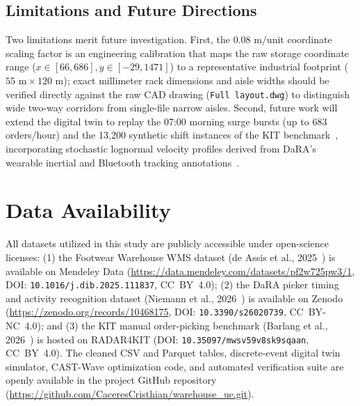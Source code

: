 \documentclass[conference]{IEEEtran}
\begin{document}
\subsection{Limitations and Future Directions}
\label{sec:limitations}
Two limitations merit future investigation. First, the $0.08\text{ m/unit}$ coordinate scaling factor is an engineering calibration that maps the raw storage coordinate range ($x \in [66, 686], y \in [-29, 1471]$) to a representative industrial footprint ($55\text{ m} \times 120\text{ m}$); exact millimeter rack dimensions and aisle widths should be verified directly against the raw CAD drawing (\texttt{Full layout.dwg}) to distinguish wide two-way corridors from single-file narrow aisles. Second, future work will extend the digital twin to replay the 07:00 morning surge bursts (up to 683 orders/hour) and the 13,200 synthetic shift instances of the KIT benchmark~\cite{barlang2026kit}, incorporating stochastic lognormal velocity profiles derived from DaRA's wearable inertial and Bluetooth tracking annotations~\cite{niemann2026dara}.

\section{Data Availability}
\label{sec:data_availability}
All datasets utilized in this study are publicly accessible under open-science licenses: (1) the Footwear Warehouse WMS dataset (de Assis et al., 2025~\cite{assis2025order}) is available on Mendeley Data (\url{https://data.mendeley.com/datasets/pf2w725pw3/1}, DOI: \texttt{10.1016/j.dib.2025.111837}, CC~BY~4.0); (2) the DaRA picker timing and activity recognition dataset (Niemann et al., 2026~\cite{niemann2026dara}) is available on Zenodo (\url{https://zenodo.org/records/10468175}, DOI: \texttt{10.3390/s26020739}, CC~BY-NC~4.0); and (3) the KIT manual order-picking benchmark (Barlang et al., 2026~\cite{barlang2026kit}) is hosted on RADAR4KIT (DOI: \texttt{10.35097/mwsv59v8sk9sqaan}, CC~BY~4.0). The cleaned CSV and Parquet tables, discrete-event digital twin simulator, CAST-Wave optimization code, and automated verification suite are openly available in the project GitHub repository (\url{https://github.com/CaceresCristhian/warehouse_ue.git}).
\end{document}
